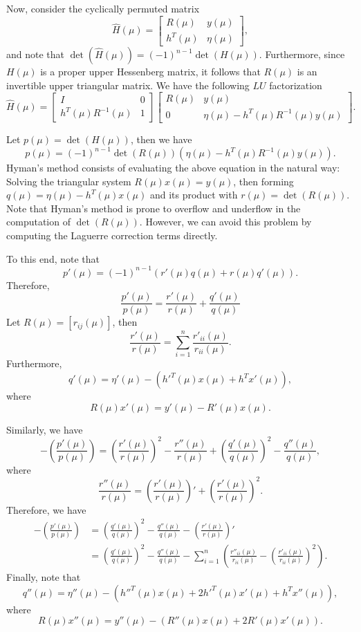 \documentclass{article}
\begin{document}
Now, consider the cyclically permuted matrix
\[
\hat{H}(\mu)=
\begin{bmatrix}
R(\mu) & y(\mu) \\
h^{T}(\mu) & \eta(\mu)
\end{bmatrix},
\]
and note that $\det(\hat{H}(\mu))=(-1)^{n-1}\det(H(\mu))$.
Furthermore, since $H(\mu)$ is a proper upper Hessenberg matrix, it follows that $R(\mu)$ is an invertible upper triangular matrix. 
We have the following $LU$ factorization
\[
\hat{H}(\mu)=
\begin{bmatrix}
I & 0 \\
h^{T}(\mu)R^{-1}(\mu) & 1
\end{bmatrix}
\begin{bmatrix}
R(\mu) & y(\mu) \\
0 & \eta(\mu)-h^{T}(\mu)R^{-1}(\mu)y(\mu)
\end{bmatrix}.
\]

Let $p(\mu)=\det(H(\mu))$, then we have
\[
p(\mu) = (-1)^{n-1}\det(R(\mu))\left(\eta(\mu)-h^{T}(\mu)R^{-1}(\mu)y(\mu)\right).
\]
Hyman's method consists of evaluating the above equation in the natural way:
Solving the triangular system $R(\mu)x(\mu)=y(\mu)$, then forming $q(\mu)=\eta(\mu)-h^{T}(\mu)x(\mu)$ and its product with $r(\mu)=\det(R(\mu))$.
Note that Hyman's method is prone to overflow and underflow in the computation of $\det(R(\mu))$. 
However, we can avoid this problem by computing the Laguerre correction terms directly.

To this end, note that
\[
p'(\mu)=(-1)^{n-1}\left(r'(\mu)q(\mu)+r(\mu)q'(\mu)\right).
\]
Therefore,
\[
\frac{p'(\mu)}{p(\mu)} = \frac{r'(\mu)}{r(\mu)} + \frac{q'(\mu)}{q(\mu)}
\]
Let $R(\mu)=[r_{ij}(\mu)]$, then
\[
\frac{r'(\mu)}{r(\mu)}=\sum_{i=1}^{n}\frac{r'_{ii}(\mu)}{r_{ii}(\mu)}.
\]
Furthermore,
\[
q'(\mu)=\eta'(\mu)-\left(h'^{T}(\mu)x(\mu)+h^{T}x'(\mu)\right),
\]
where
\[
R(\mu)x'(\mu)=y'(\mu)-R'(\mu)x(\mu).
\]

Similarly, we have
\[
-\left(\frac{p'(\mu)}{p(\mu)}\right) = \left(\frac{r'(\mu)}{r(\mu)}\right)^{2} - \frac{r''(\mu)}{r(\mu)}+ \left(\frac{q'(\mu)}{q(\mu)}\right)^{2} - \frac{q''(\mu)}{q(\mu)},
\]
where 
\[
\frac{r''(\mu)}{r(\mu)}=\left(\frac{r'(\mu)}{r(\mu)}\right)' + \left(\frac{r'(\mu)}{r(\mu)}\right)^{2}. 
\]
Therefore, we have
\begin{align*}
-\left(\frac{p'(\mu)}{p(\mu)}\right) &=  \left(\frac{q'(\mu)}{q(\mu)}\right)^{2} - \frac{q''(\mu)}{q(\mu)} - \left(\frac{r'(\mu)}{r(\mu)}\right)' \\
&=  \left(\frac{q'(\mu)}{q(\mu)}\right)^{2} - \frac{q''(\mu)}{q(\mu)} - \sum_{i=1}^{n}\left(\frac{r''_{ii}(\mu)}{r_{ii}(\mu)} - \left(\frac{r'_{ii}(\mu)}{r_{ii}(\mu)}\right)^{2}\right).
\end{align*}
Finally, note that 
\[
q''(\mu)=\eta''(\mu)-\left(h''^{T}(\mu)x(\mu)+2h'^{T}(\mu)x'(\mu)+h^{T}x''(\mu)\right),
\]
where 
\[
R(\mu)x''(\mu)=y''(\mu)-\left(R''(\mu)x(\mu)+2R'(\mu)x'(\mu)\right).
\]
\end{document}
